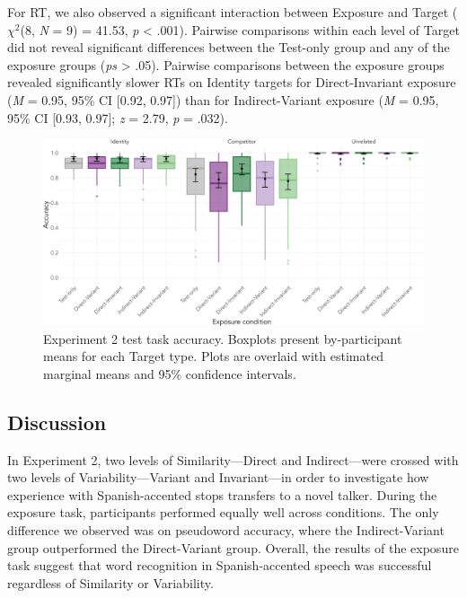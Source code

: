 \documentclass[preprint, 3p, authoryear]{elsarticle} %
\begin{document}
For RT, we also observed a significant interaction between Exposure and Target (\(\chi^2\)(8, \emph{N} = 9) = 41.53, \emph{p} \textless{} .001).
Pairwise comparisons within each level of Target did not reveal significant differences between the Test-only group and any of the exposure groups (\emph{ps} \textgreater{} .05).
Pairwise comparisons between the exposure groups revealed significantly slower RTs on Identity targets for Direct-Invariant exposure (\emph{M} = 0.95, 95\% CI {[}0.92, 0.97{]}) than for Indirect-Variant exposure (\emph{M} = 0.95, 95\% CI {[}0.93, 0.97{]}; \emph{z} = 2.79, \emph{p} = .032).

\begin{figure}

{\centering \includegraphics[width=\textwidth]{sections/code/outputs/plot_test_1b} 

}

\caption{Experiment 2 test task accuracy. Boxplots present by-participant means for each Target type. Plots are overlaid with estimated marginal means and 95\% confidence intervals.}\label{fig:exp2-test-fig}
\end{figure}

\hypertarget{discuss-1b}{%
\subsection{Discussion}\label{discuss-1b}}

In Experiment 2, two levels of Similarity---Direct and Indirect---were crossed with two levels of Variability---Variant and Invariant---in order to investigate how experience with Spanish-accented stops transfers to a novel talker.
During the exposure task, participants performed equally well across conditions.
The only difference we observed was on pseudoword accuracy, where the Indirect-Variant group outperformed the Direct-Variant group.
Overall, the results of the exposure task suggest that word recognition in Spanish-accented speech was successful regardless of Similarity or Variability.
\end{document}
